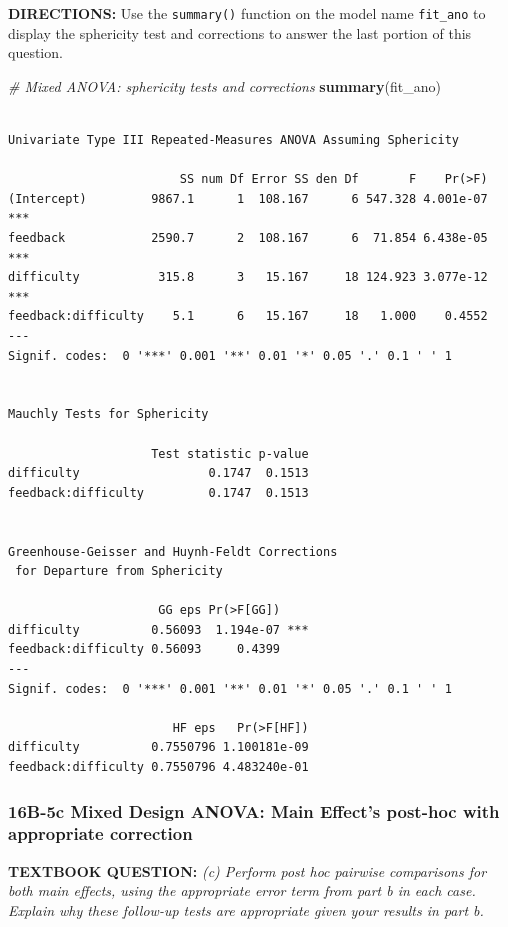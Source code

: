 \documentclass[]{article}
\newenvironment{Shaded}{\begin{snugshade}}{\end{snugshade}}
\newcommand{\KeywordTok}[1]{\textcolor[rgb]{0.13,0.29,0.53}{\textbf{#1}}}
\newcommand{\CommentTok}[1]{\textcolor[rgb]{0.56,0.35,0.01}{\textit{#1}}}
\newcommand{\NormalTok}[1]{#1}
\begin{document}
\clearpage

\textbf{DIRECTIONS:} Use the \texttt{summary()} function on the model
name \texttt{fit\_ano} to display the sphericity test and corrections to
answer the last portion of this question.

\begin{Shaded}
\begin{Highlighting}[]
\CommentTok{# Mixed ANOVA: sphericity tests and corrections}
\KeywordTok{summary}\NormalTok{(fit_ano)}
\end{Highlighting}
\end{Shaded}

\begin{verbatim}

Univariate Type III Repeated-Measures ANOVA Assuming Sphericity

                        SS num Df Error SS den Df       F    Pr(>F)    
(Intercept)         9867.1      1  108.167      6 547.328 4.001e-07 ***
feedback            2590.7      2  108.167      6  71.854 6.438e-05 ***
difficulty           315.8      3   15.167     18 124.923 3.077e-12 ***
feedback:difficulty    5.1      6   15.167     18   1.000    0.4552    
---
Signif. codes:  0 '***' 0.001 '**' 0.01 '*' 0.05 '.' 0.1 ' ' 1


Mauchly Tests for Sphericity

                    Test statistic p-value
difficulty                  0.1747  0.1513
feedback:difficulty         0.1747  0.1513


Greenhouse-Geisser and Huynh-Feldt Corrections
 for Departure from Sphericity

                     GG eps Pr(>F[GG])    
difficulty          0.56093  1.194e-07 ***
feedback:difficulty 0.56093     0.4399    
---
Signif. codes:  0 '***' 0.001 '**' 0.01 '*' 0.05 '.' 0.1 ' ' 1

                       HF eps   Pr(>F[HF])
difficulty          0.7550796 1.100181e-09
feedback:difficulty 0.7550796 4.483240e-01
\end{verbatim}

\clearpage

\subsubsection{16B-5c Mixed Design ANOVA: Main Effect's post-hoc with
appropriate
correction}\label{b-5c-mixed-design-anova-main-effects-post-hoc-with-appropriate-correction}

\textbf{TEXTBOOK QUESTION:} \emph{(c) Perform post hoc pairwise
comparisons for both main effects, using the appropriate error term from
part b in each case. Explain why these follow-up tests are appropriate
given your results in part b.}
\end{document}
